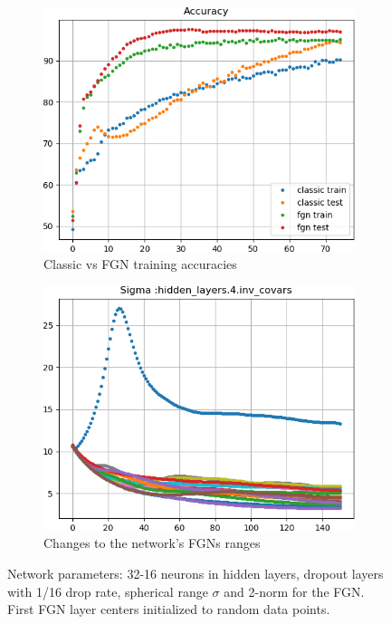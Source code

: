 \documentclass[12pt,oneside]{CUNY_PhD}
\begin{document}
\begin{figure}[!htbp]
    \centering
    \begin{subfigure}[t]{0.49\textwidth}
        \includegraphics[width=\textwidth]{images/2D-network-toy/training-accuracy.png}
        \caption*{Classic vs FGN training accuracies}
    \end{subfigure}
    \begin{subfigure}[t]{0.49\textwidth}
        \includegraphics[width=\textwidth]{images/2D-network-toy/sigmas-change.png}
        \caption*{Changes to the network's FGNs ranges}
    \end{subfigure}
    \caption{Network parameters: 32-16 neurons in hidden layers, dropout layers with 1/16 drop rate, spherical range $\sigma$ and 2-norm for the FGN. First FGN layer centers initialized to random data points.}
    \label{fig:toy-2d-params}
\end{figure}
 
\end{document}
